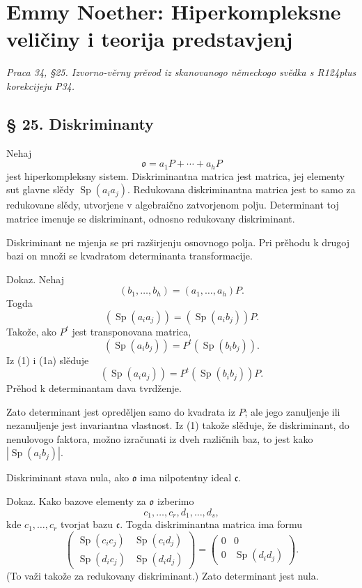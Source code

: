 \documentclass[11pt]{article}
\providecommand{\mo}{\mathfrak{o}}
\providecommand{\mc}{\mathfrak{c}}
\begin{document}
\section*{Emmy Noether: Hiperkompleksne veličiny i teorija predstavjenj}
\emph{Praca 34, §25. Izvorno-věrny prěvod iz skanovanogo německogo svědka s R124plus korekcijeju P34.}

\subsection*{§ 25. Diskriminanty}

Nehaj
\[
        \mo=a_1P+\cdots+a_hP
\]
jest hiperkompleksny sistem. Diskriminantna matrica jest matrica, jej elementy sut glavne slědy $\operatorname{Sp}(a_i a_j)$. Redukovana diskriminantna matrica jest to samo za redukovane slědy, utvorjene v algebraično zatvorjenom polju. Determinant toj matrice imenuje se diskriminant, odnosno redukovany diskriminant.

Diskriminant ne mjenja se pri razširjenju osnovnogo polja. Pri prěhodu k drugoj bazi on množi se kvadratom determinanta transformacije.

Dokaz. Nehaj
\[
        (b_1,\ldots,b_h)=(a_1,\ldots,a_h)P.
\]
Togda
\[
        (\operatorname{Sp}(a_i a_j))=(\operatorname{Sp}(a_i b_j))P.             \tag{1}
\]
Takože, ako $P^t$ jest transponovana matrica,
\[
        (\operatorname{Sp}(a_i b_j))=P^t(\operatorname{Sp}(b_i b_j)).           \tag{1a}
\]
Iz (1) i (1a) slěduje
\[
        (\operatorname{Sp}(a_i a_j))=P^t(\operatorname{Sp}(b_i b_j))P.
\]
Prěhod k determinantam dava tvrdženje.

Zato determinant jest opreděljen samo do kvadrata iz $P$; ale jego zanuljenje ili nezanuljenje jest invariantna vlastnost. Iz (1) takože slěduje, že diskriminant, do nenulovogo faktora, možno izračunati iz dveh različnih baz, to jest kako $|\operatorname{Sp}(a_i b_j)|$.

Diskriminant stava nula, ako $\mo$ ima nilpotentny ideal $\mc$.

Dokaz. Kako bazove elementy za $\mo$ izberimo
\[
        c_1,\ldots,c_r,d_1,\ldots,d_s,
\]
kde $c_1,\ldots,c_r$ tvorjat bazu $\mc$. Togda diskriminantna matrica ima formu
\[
        \begin{pmatrix}
        \operatorname{Sp}(c_i c_j)&\operatorname{Sp}(c_i d_j)\\
        \operatorname{Sp}(d_i c_j)&\operatorname{Sp}(d_i d_j)
        \end{pmatrix}
        =
        \begin{pmatrix}
        0&0\\
        0&\operatorname{Sp}(d_i d_j)
        \end{pmatrix}.
\]
(To važi takože za redukovany diskriminant.) Zato determinant jest nula.
\end{document}
